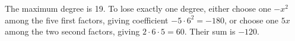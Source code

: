 The maximum degree is 19. To lose exactly one degree, either choose one $-x^2$ among the five first factors, giving coefficient $-5\cdot6^2=-180$, or choose one $5x$ among the two second factors, giving $2\cdot6\cdot5=60$. Their sum is $\boxed{-120}$.
